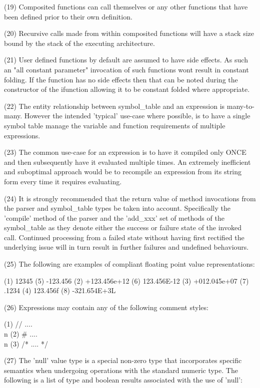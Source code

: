 {(19) Composited functions can call themselves or any other functions
that have been defined prior to their own definition.

(20) Recursive calls made from within composited functions will have
a stack size bound by the stack of the executing architecture.

(21) User  defined functions  by default  are assumed  to have  side
effects. As such an "all constant parameter" invocation of such
functions wont result in constant folding. If the function  has
no side effects then that  can be noted during the  constructor
of  the  ifunction  allowing it  to  be  constant folded  where
appropriate.

(22) The entity relationship between symbol\_table and an  expression
is many-to-many. However the intended 'typical' use-case  where
possible, is to have a single symbol table manage the  variable
and function requirements of multiple expressions.

(23) The common use-case  for an expression  is to have  it compiled
only  ONCE  and  then subsequently  have it  evaluated multiple
times. An extremely  inefficient and suboptimal  approach would
be to recompile an expression  from its string form every  time
it requires evaluating.

(24) It is  strongly recommended  that  the  return value  of method
invocations from  the parser  and symbol\_table  types be  taken
into account. Specifically the  'compile' method of the  parser
and the 'add\_xxx'  set of methods  of the symbol\_table  as they
denote either the success or failure state of the invoked call.
Continued processing from  a failed  state without having first
rectified the underlying issue  will in turn result  in further
failures and undefined behaviours.

(25) The following are examples of compliant floating point value
representations:

(1) 12345         (5) -123.456
(2) +123.456e+12  (6) 123.456E-12
(3) +012.045e+07  (7) .1234
(4) 123.456f      (8) -321.654E+3L

(26) Expressions may contain any of the following comment styles:

(1) // .... \\n
(2) \#  .... \\n
(3) /* .... */

(27) The  'null'  value  type  is  a  special  non-zero  type   that
incorporates specific semantics when undergoing operations with
the standard numeric type. The following is a list of type  and
boolean results associated with the use of 'null':

}
